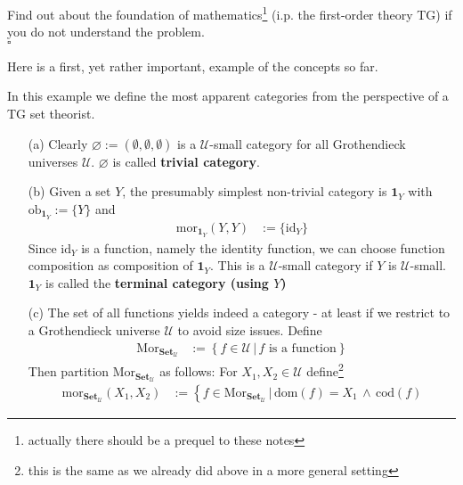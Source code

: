 \begin{prf}
Find out about the foundation of mathematics\footnote{actually there should be a prequel to these notes} (i.p. the first-order theory TG) if you do not understand the problem.
\\
\phantom{proven}
\hfill
$\square$
\end{prf}
Here is a first, yet rather important, example of the concepts so far.
\\
\begin{exa}
\label{exa:basiccats1}
In this example we define the most apparent categories from the perspective of a TG set theorist.
\begin{enumerate}
\item[(a)]
Clearly $\mathbf{\varnothing} := (\emptyset,\emptyset,\emptyset)$ is a $\mathcal{U}$-small category for all Grothendieck universes $\mathcal{U}$. $\mathbf{\varnothing}$ is called \textbf{trivial category}.
\item[(b)]
Given a set $Y$, the presumably simplest non-trivial category is $\mathbf{1}_{Y}$ with $\mathrm{ob}_{\mathbf{1}_{Y}} := \lbrace Y \rbrace$ and
\begin{align*}
  \mathrm{mor}_{\mathbf{1}_{Y}}(Y,Y)
  &:=
  \lbrace
    \mathrm{id}_{Y}
  \rbrace
\end{align*}
Since $\mathrm{id}_{Y}$ is a function, namely the identity function, we can choose function composition as composition of $\mathbf{1}_{Y}$. This is a $\mathcal{U}$-small category if $Y$ is $\mathcal{U}$-small. $\mathbf{1}_{Y}$ is called the \textbf{terminal category (using $Y$)}
\item[(c)]
The set of all functions yields indeed a category - at least if we restrict to a Grothendieck universe $\mathcal{U}$ to avoid size issues. Define
\begin{align*}
  \mathrm{Mor}_{\mathbf{Set}_{\mathcal{U}}}
  &:=
  \left\lbrace
      f
      \in
      \mathcal{U}
    \,
    \vert
    \,
      f
      \text{ is a function}
  \right\rbrace
\end{align*}
Then partition $\mathrm{Mor}_{\mathbf{Set}_{\mathcal{U}}}$ as follows: For $X_{1},X_{2} \in \mathcal{U}$ define\footnote{this is the same as we already did above in a more general setting}
\begin{align*}
  \mathrm{mor}_{\mathbf{Set}_{\mathcal{U}}}(X_{1},X_{2})
  &:=
  \left\lbrace
      f
      \in
      \mathrm{Mor}_{\mathbf{Set}_{\mathcal{U}}}
    \,
    \vert
    \,
      \mathrm{dom}(f)
      =
      X_{1}
      \,
      \land
      \,
      \mathrm{cod}(f)

\end{align*}
\end{enumerate}
\end{exa}
